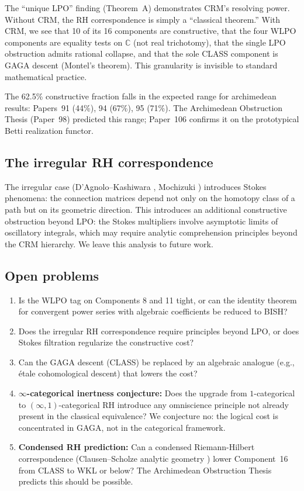 \documentclass[11pt,a4paper]{article}
\theoremstyle{plain}
\theoremstyle{definition}
\newcommand{\BISH}{\textsf{BISH}}
\newcommand{\WKL}{\textsf{WKL}}
\newcommand{\WLPO}{\textsf{WLPO}}
\newcommand{\LPO}{\textsf{LPO}}
\newcommand{\CLASS}{\textsf{CLASS}}
\newcommand{\C}{\mathbb{C}}
\begin{document}
The ``unique LPO'' finding (Theorem~A) demonstrates CRM's resolving power.
Without CRM, the RH correspondence is simply a ``classical theorem.''
With CRM, we see that 10 of its 16 components are constructive, that the four WLPO components are equality tests on $\C$ (not real trichotomy), that the single LPO obstruction admits rational collapse, and that the sole \CLASS{} component is GAGA descent (Montel's theorem).
This granularity is invisible to standard mathematical practice.

The 62.5\% constructive fraction falls in the expected range for archimedean results: Papers~91 (44\%), 94 (67\%), 95 (71\%).
The Archimedean Obstruction Thesis (Paper~98) predicted this range; Paper~106 confirms it on the prototypical Betti realization functor.

\subsection{The irregular RH correspondence}

The irregular case (D'Agnolo--Kashiwara \cite{DAgnoloKashiwara2016}, Mochizuki \cite{Mochizuki2011}) introduces Stokes phenomena: the connection matrices depend not only on the homotopy class of a path but on its geometric direction.
This introduces an additional constructive obstruction beyond \LPO{}: the Stokes multipliers involve asymptotic limits of oscillatory integrals, which may require analytic comprehension principles beyond the CRM hierarchy.
We leave this analysis to future work.

\subsection{Open problems}

\begin{enumerate}[nosep]
\item Is the \WLPO{} tag on Components 8 and 11 tight, or can the identity theorem for convergent power series with algebraic coefficients be reduced to \BISH?
\item Does the irregular RH correspondence require principles beyond \LPO, or does Stokes filtration regularize the constructive cost?
\item Can the GAGA descent (\CLASS) be replaced by an algebraic analogue (e.g., \'etale cohomological descent) that lowers the cost?
\item \textbf{$\infty$-categorical inertness conjecture:} Does the upgrade from $1$-categorical to $(\infty,1)$-categorical RH introduce any omniscience principle not already present in the classical equivalence?  We conjecture no: the logical cost is concentrated in GAGA, not in the categorical framework.
\item \textbf{Condensed RH prediction:} Can a condensed Riemann-Hilbert correspondence (Clausen--Scholze analytic geometry \cite{ClausenScholze2022}) lower Component~16 from \CLASS{} to \WKL{} or below?  The Archimedean Obstruction Thesis predicts this should be possible.
\end{enumerate}
\end{document}
